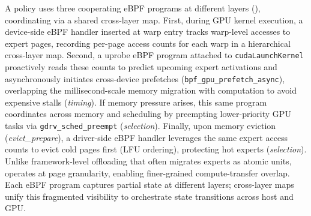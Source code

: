 A \sys{} policy uses three cooperating eBPF programs at different layers (), coordinating via a shared cross-layer map.
First, during GPU kernel execution, a device-side eBPF handler inserted at warp entry tracks warp-level accesses to expert pages, recording per-page access counts for each warp in a hierarchical cross-layer map.
Second, a uprobe eBPF program attached to \texttt{cuda\-Launch\-Kernel} proactively reads these counts to predict upcoming expert activations and asynchronously initiates cross-device prefetches (\texttt{bpf\_gpu\_\allowbreak{}prefetch\_async}), overlapping the millisecond-scale memory migration with computation to avoid expensive stalls (\emph{timing}).
If memory pressure arises, this same program coordinates across memory and scheduling by preempting lower-priority GPU tasks via \texttt{gdrv\_sched\_\allowbreak{}preempt} (\emph{selection}).
Finally, upon memory eviction (\emph{evict\_prepare}), a driver-side eBPF handler leverages the same expert access counts to evict cold pages first (LFU ordering), protecting hot experts (\emph{selection}).
Unlike framework-level offloading that often migrates experts as atomic units, \sys{} operates at page granularity, enabling finer-grained compute-transfer overlap.
Each eBPF program captures partial state at different layers; cross-layer maps unify this fragmented visibility to orchestrate state transitions across host and GPU.

